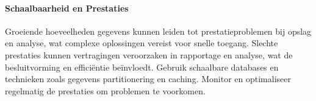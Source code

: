 \paragraph{Schaalbaarheid en Prestaties}
Groeiende hoeveelheden gegevens kunnen leiden tot prestatieproblemen bij opslag en analyse, wat complexe oplossingen vereist voor snelle toegang. Slechte prestaties kunnen vertragingen veroorzaken in rapportage en analyse, wat de besluitvorming en efficiëntie beïnvloedt. Gebruik schaalbare databases en technieken zoals gegevens partitionering en caching. Monitor en optimaliseer regelmatig de prestaties om problemen te voorkomen.
